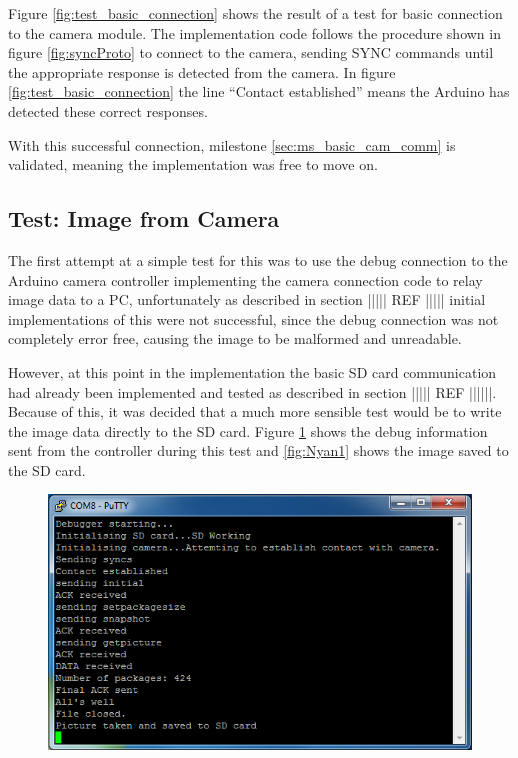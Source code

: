 Figure \ref{fig:test_basic_connection} shows the result of a test for basic connection to the camera module. The implementation code follows the procedure shown in figure \ref{fig:syncProto} to connect to the camera, sending SYNC commands until the appropriate response is detected from the camera. In figure \ref{fig:test_basic_connection} the line ``Contact established'' means the Arduino has detected these correct responses.

With this successful connection, milestone \ref{sec:ms_basic_cam_comm} is validated, meaning the implementation was free to move on.

\subsection{Test: Image from Camera}

The first attempt at a simple test for this was to use the debug connection to the Arduino camera
controller implementing the camera connection code to relay image data to a PC, unfortunately as 
described in section ||||| REF ||||| initial implementations of this were not successful, since
the debug connection was not completely error free, causing the image to be malformed and
unreadable.

However, at this point in the implementation the basic SD card communication had already been
implemented and tested as described in section ||||| REF ||||||. Because of this, it was decided 
that a much more sensible test would be to write the image data directly to the SD card. Figure
\ref{fig:test_camera_image_saving_sd_card} shows the debug information sent from the controller
during this test and \ref{fig:Nyan1} shows the image saved to the SD card.

\begin{figure}[H]
        \centering
        \includegraphics[width=1.00\textwidth]{testing_screenshots/camera_image_saving_sd_card_test.png}
        \label{fig:test_camera_image_saving_sd_card}
\end{figure}

